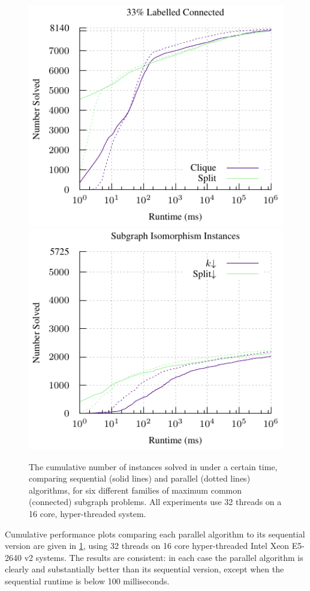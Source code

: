 \documentclass{llncs}
\begin{document}
\begin{figure}[p]
    \vspace*{1em}
    \includegraphics*[scale=0.7]{plots/33ve-connected-par-cumulative.pdf}
    \hfill
    \includegraphics*[scale=0.7]{plots/sip-par-cumulative.pdf}

    \caption{The cumulative number of instances solved in under a certain time, comparing sequential
    (solid lines) and parallel (dotted lines) algorithms, for six different families of maximum
    common (connected) subgraph problems. All experiments use 32 threads on a 16 core,
    hyper-threaded system.}
    \label{figure:mcs-par-unconnected-cumulative}
\end{figure}

Cumulative performance plots comparing each parallel algorithm to its sequential version are given
in \cref{figure:mcs-par-unconnected-cumulative}, using 32 threads on 16 core hyper-threaded Intel Xeon
E5-2640 v2 systems. The results are consistent: in each case the parallel algorithm is clearly and
substantially better than its sequential version, except when the sequential runtime is below 100
milliseconds.
\end{document}
